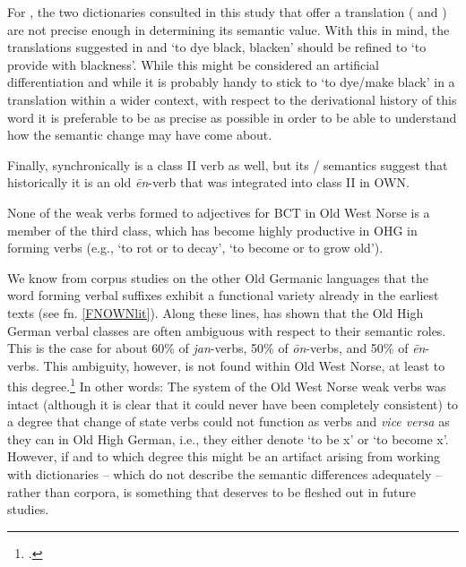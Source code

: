 \documentclass[output=paper,colorlinks,citecolor=brown]{langscibook}
\begin{document}
For , the two dictionaries consulted in this study that offer a translation ( and ) are not precise enough in determining its semantic value. With this in mind, the translations suggested in  and  ‘to dye black, blacken’ should be refined to ‘to provide with blackness’. While this might be considered an artificial differentiation and while it is probably handy to stick to ‘to dye/make black’ in a translation within a wider context, with respect to the derivational history of this word it is preferable to be as precise as possible in order to be able to understand how the semantic change may have come about.

Finally, synchronically  is a class II verb as well, but its / semantics suggest that historically it is an old \textit{ēn}-verb that was integrated into class II in OWN.

None of the weak verbs formed to adjectives for BCT  in Old West Norse is a member of the third class, which has become highly productive in OHG in forming  verbs (e.g.,  ‘to rot or to decay’,  ‘to become or to grow old’).

We know from corpus studies on the other Old Germanic languages that the word forming verbal suffixes exhibit a functional variety already in the earliest texts (see fn. \ref{FNOWNlit}). Along these lines, \citet{Schwerdt2008} has shown that the Old High German verbal classes are often ambiguous with respect to their semantic roles. This is the case for about 60\% of \textit{jan}-verbs, 50\% of \textit{ōn}-verbs, and 50\% of \textit{ēn}-verbs. This ambiguity, however, is not found within Old West Norse, at least to this degree.\footnote{\citet{Boldtinpress}.} In other words: The system of the Old West Norse weak verbs was intact (although it is clear that it could never have been completely consistent) to a degree that change of state  verbs could not function as  verbs and \textit{vice versa} as they can in Old High German, i.e., they either denote ‘to be x' or ‘to become x'. However, if and to which degree this might be an artifact arising from working with dictionaries – which do not describe the semantic differences adequately – rather than corpora, is something that deserves to be fleshed out in future studies.
\end{document}
